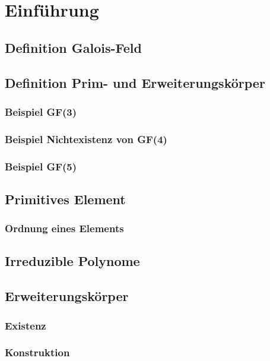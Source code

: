 \section{Einführung}
\subsection{Definition Galois-Feld}
\subsection{Definition Prim- und Erweiterungskörper}
\subsubsection*{Beispiel GF(3)}
\subsubsection*{Beispiel Nichtexistenz von GF(4)}
\subsubsection*{Beispiel GF(5)}

\subsection{Primitives Element}
\subsubsection*{Ordnung eines Elements}
\subsection{Irreduzible Polynome}
\subsection{Erweiterungskörper}
\subsubsection{Existenz}
\subsubsection{Konstruktion}

